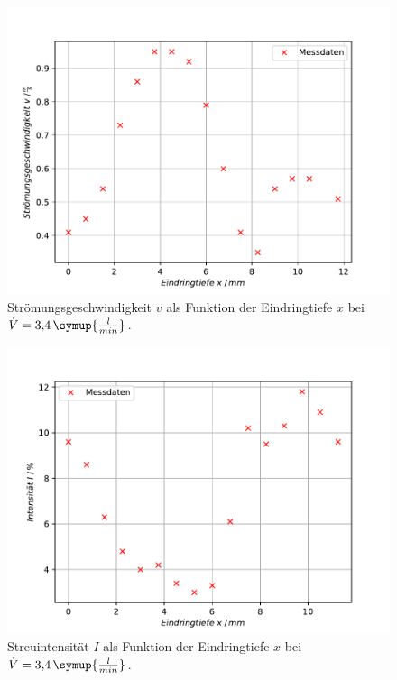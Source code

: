 \begin{figure}[h!tbp]
	\centering
	\includegraphics[width=0.8\linewidth]{geschw_34.pdf}
	\caption{Strömungsgeschwindigkeit $v$ als Funktion der Eindringtiefe $x$ bei $\dot{V} = 3{,}4\,\symup{\frac{l}{min}}$.}
	\label{fig:profil3}
\end{figure}


\begin{figure}[h!tbp]
	\centering
	\includegraphics[width=0.8\linewidth]{streu_34.pdf}
	\caption{Streuintensität $I$ als Funktion der Eindringtiefe $x$ bei $\dot{V} = 3{,}4\,\symup{\frac{l}{min}}$.}
	\label{fig:profil4}
\end{figure}
